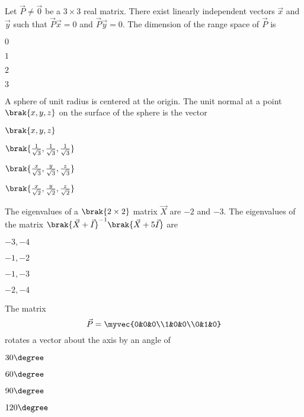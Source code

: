 \item Let  $\vec{P} \not= \vec{0}$ be a $3 \times 3$ real matrix. There exist linearly independent vectors $\Vec{x}$ and $\Vec{y}$ such that $\vec{P}\vec{x} = 0$ and $\vec{P}\vec{y} = 0$. The dimension of the range space of $\vec{P}$ is \hfill{}
\begin{enumerate}
    \begin{multicols}{4}
        \item $0$
        \item $1$
        \item $2$
        \item $3$
\end{multicols}
\end{enumerate}
\item A sphere of unit radius is centered at the origin. The unit normal at a point $\brak{x,y,z}$ on the surface of the sphere is the vector  \hfill{}
\begin{enumerate}
    \begin{multicols}{4}
        \item $\brak{x,y,z}$
        \item $\brak{\frac{1}{\sqrt{3}},\frac{1}{\sqrt{3}},\frac{1}{\sqrt{3}}}$
        \item $\brak{\frac{x}{\sqrt{3}},\frac{y}{\sqrt{3}},\frac{z}{\sqrt{3}}}$
        \item $\brak{\frac{x}{\sqrt{2}},\frac{y}{\sqrt{2}},\frac{z}{\sqrt{2}}}$
\end{multicols}
\end{enumerate}
\item The eigenvalues of a $\brak{2\times2}$ matrix $\vec{X}$ are $-2$ and $-3$. The eigenvalues of the matrix $\brak{\vec{X}+\vec{I}}^{-1}\brak{\vec{X}+5\vec{I}}$ are  \hfill{}
\begin{enumerate} 
    \begin{multicols}{4}
        \item $-3, -4$
        \item $-1,-2$
        \item $-1,-3$
        \item $-2,-4$
\end{multicols}
\end{enumerate}

 
\item The matrix $$\vec{P}= \myvec{0&0&0\\1&0&0\\0&1&0}$$
 rotates a vector about the axis  by an angle of  \hfill{}
\begin{enumerate}
    \begin{multicols}{4}
        \item $30\degree$
        \item $60\degree$
        \item $90\degree$
        \item $120\degree$
\end{multicols}
\end{enumerate}

